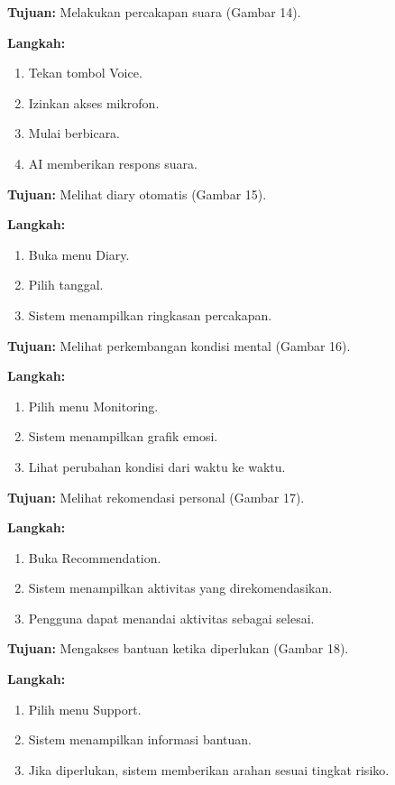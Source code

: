 \noindent\textbf{Tujuan:} Melakukan percakapan suara (Gambar 14).\par
\noindent\textbf{Langkah:}
\begin{enumerate}[leftmargin=1.5em,label=\arabic*.,itemsep=2pt,topsep=2pt]
    \item Tekan tombol Voice.
    \item Izinkan akses mikrofon.
    \item Mulai berbicara.
    \item AI memberikan respons suara.
\end{enumerate}

\noindent\textbf{Tujuan:} Melihat diary otomatis (Gambar 15).\par
\noindent\textbf{Langkah:}
\begin{enumerate}[leftmargin=1.5em,label=\arabic*.,itemsep=2pt,topsep=2pt]
    \item Buka menu Diary.
    \item Pilih tanggal.
    \item Sistem menampilkan ringkasan percakapan.
\end{enumerate}

\noindent\textbf{Tujuan:} Melihat perkembangan kondisi mental (Gambar 16).\par
\noindent\textbf{Langkah:}
\begin{enumerate}[leftmargin=1.5em,label=\arabic*.,itemsep=2pt,topsep=2pt]
    \item Pilih menu Monitoring.
    \item Sistem menampilkan grafik emosi.
    \item Lihat perubahan kondisi dari waktu ke waktu.
\end{enumerate}

\noindent\textbf{Tujuan:} Melihat rekomendasi personal (Gambar 17).\par
\noindent\textbf{Langkah:}
\begin{enumerate}[leftmargin=1.5em,label=\arabic*.,itemsep=2pt,topsep=2pt]
    \item Buka Recommendation.
    \item Sistem menampilkan aktivitas yang direkomendasikan.
    \item Pengguna dapat menandai aktivitas sebagai selesai.
\end{enumerate}

\noindent\textbf{Tujuan:} Mengakses bantuan ketika diperlukan (Gambar 18).\par
\noindent\textbf{Langkah:}
\begin{enumerate}[leftmargin=1.5em,label=\arabic*.,itemsep=2pt,topsep=2pt]
    \item Pilih menu Support.
    \item Sistem menampilkan informasi bantuan.
    \item Jika diperlukan, sistem memberikan arahan sesuai tingkat risiko.
\end{enumerate}

